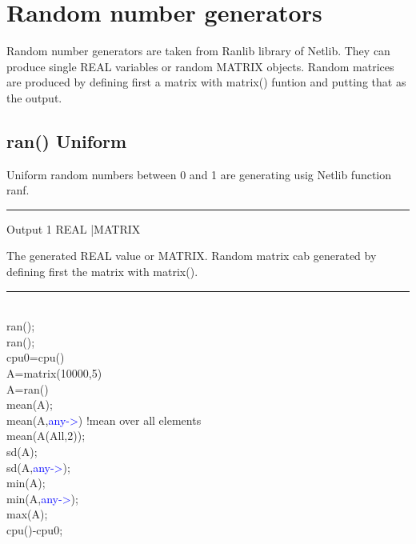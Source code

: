 \section{Random number generators}
\label{randomgen}
Random number generators are taken from Ranlib library of Netlib.
They can produce single REAL variables or random MATRIX objects.
Random matrices are produced by defining first a matrix with \textcolor{VioletRed}{matrix}()
funtion and putting that as the output.
\subsection{\textcolor{VioletRed}{ran}() Uniform}
\label{ran}
Uniform random numbers between 0 and 1 are generating usig Netlib function ranf.
\vspace{0.3cm}
\hrule
\vspace{0.3cm}
\noindent Output \tabto{3cm}  1 \tabto{5cm}   REAL |MATRIX   \tabto{7cm}
\begin{changemargin}{3cm}{0cm}
\noindent  The generated REAL value or MATRIX.
Random matrix cab generated by defining first the matrix with \textcolor{VioletRed}{matrix}().
\end {changemargin}
\hrule
\vspace{0.2cm}
\begin{example}[ranex]\\
\label{ranex}
\textcolor{VioletRed}{ran}();\\
\textcolor{VioletRed}{ran}();\\
cpu0=\textcolor{VioletRed}{cpu}()\\
A=\textcolor{VioletRed}{matrix}(10000,5)\\
A=\textcolor{VioletRed}{ran}()\\
\textcolor{VioletRed}{mean}(A);\\
\textcolor{VioletRed}{mean}(A,\textcolor{blue}{any->}) !mean over all elements\\
\textcolor{VioletRed}{mean}(A(All,2));\\
\textcolor{VioletRed}{sd}(A);\\
\textcolor{VioletRed}{sd}(A,\textcolor{blue}{any->});\\
\textcolor{VioletRed}{min}(A);\\
\textcolor{VioletRed}{min}(A,\textcolor{blue}{any->});\\
\textcolor{VioletRed}{max}(A);\\
\textcolor{VioletRed}{cpu}()-cpu0;

\end{example}

